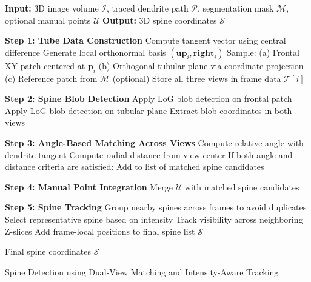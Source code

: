 \begin{algorithm}[htb]
\footnotesize
\begin{algorithmic}[1]
    \State \textbf{Input:} 3D image volume $\mathcal{I}$, traced dendrite path $\mathcal{P}$, segmentation mask $\mathcal{M}$, optional manual points $\mathcal{U}$
    \State \textbf{Output:} 3D spine coordinates $\mathcal{S}$

    \State 
    \State \textbf{Step 1: Tube Data Construction}
        \State Compute tangent vector using central difference
        \State Generate local orthonormal basis $(\mathbf{up}_i, \mathbf{right}_i)$
        \State Sample:
        \State \hspace{1em} (a) Frontal XY patch centered at $\mathbf{p}_i$
        \State \hspace{1em} (b) Orthogonal tubular plane via coordinate projection
        \State \hspace{1em} (c) Reference patch from $\mathcal{M}$ (optional)
        \State Store all three views in frame data $\mathcal{T}[i]$
    \EndFor

    \State 
    \State \textbf{Step 2: Spine Blob Detection}
        \State Apply LoG blob detection on frontal patch
        \State Apply LoG blob detection on tubular plane 
        \State Extract blob coordinates in both views
    \EndFor

    \State 
    \State \textbf{Step 3: Angle-Based Matching Across Views}
            \State Compute relative angle with dendrite tangent
            \State Compute radial distance from view center
            \State If both angle and distance criteria are satisfied:
            \State \hspace{1em} Add to list of matched spine candidates
        \EndFor
    \EndFor

    \State 
    \State \textbf{Step 4: Manual Point Integration}
        \State Merge $\mathcal{U}$ with matched spine candidates
    \EndIf

    \State 
    \State \textbf{Step 5: Spine Tracking}
    \State Group nearby spines across frames to avoid duplicates
        \State Select representative spine based on intensity
        \State Track visibility across neighboring Z-slices
            \State Add frame-local positions to final spine list $\mathcal{S}$
        \EndIf
    \EndFor

    \State 
    \State \Return Final spine coordinates $\mathcal{S}$
\end{algorithmic}
\caption{Spine Detection using Dual-View Matching and Intensity-Aware Tracking}
\label{alg:spine_detection}
\end{algorithm}

